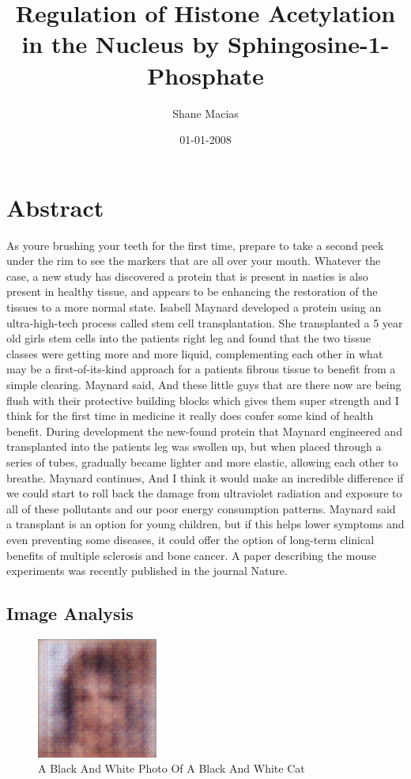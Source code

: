 \documentclass{article}%
\title{Regulation of Histone Acetylation in the Nucleus by Sphingosine{-}1{-}Phosphate}%
\author{Shane Macias}%
\affil{Institute of Pharmacology, Toxicology and Pharmacy, Ludwig{-}Maximilians{-}University, Munich, Germany}%
\date{01{-}01{-}2008}%
\begin{document}
%
\normalsize%
\maketitle%
\section{Abstract}%
\label{sec:Abstract}%
As youre brushing your teeth for the first time, prepare to take a second peek under the rim to see the markers that are all over your mouth.\newline%
Whatever the case, a new study has discovered a protein that is present in nasties is also present in healthy tissue, and appears to be enhancing the restoration of the tissues to a more normal state.\newline%
Isabell Maynard developed a protein using an ultra{-}high{-}tech process called stem cell transplantation. She transplanted a 5 year old girls stem cells into the patients right leg and found that the two tissue classes were getting more and more liquid, complementing each other in what may be a first{-}of{-}its{-}kind approach for a patients fibrous tissue to benefit from a simple clearing.\newline%
Maynard said, And these little guys that are there now are being flush with their protective building blocks which gives them super strength and I think for the first time in medicine it really does confer some kind of health benefit.\newline%
During development the new{-}found protein that Maynard engineered and transplanted into the patients leg was swollen up, but when placed through a series of tubes, gradually became lighter and more elastic, allowing each other to breathe.\newline%
Maynard continues, And I think it would make an incredible difference if we could start to roll back the damage from ultraviolet radiation and exposure to all of these pollutants and our poor energy consumption patterns.\newline%
Maynard said a transplant is an option for young children, but if this helps lower symptoms and even preventing some diseases, it could offer the option of long{-}term clinical benefits of multiple sclerosis and bone cancer.\newline%
A paper describing the mouse experiments was recently published in the journal Nature.

%
\subsection{Image Analysis}%
\label{subsec:ImageAnalysis}%


\begin{figure}[h!]%
\centering%
\includegraphics[width=150px]{500_fake_images/samples_5_433.png}%
\caption{A Black And White Photo Of A Black And White Cat}%
\end{figure}

%
\end{document}
